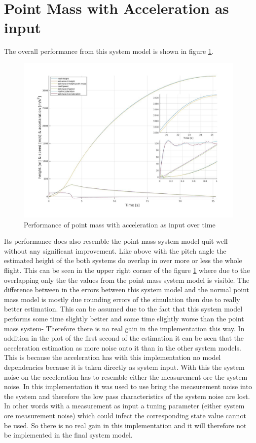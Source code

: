 \newpage
\section{Point Mass with Acceleration as input}
The overall performance from this system model is shown in figure \ref{fig:PointMassAccInputPerformance}.

\begin{figure}[h!]
 \centering
 \includegraphics[width=.8 \textwidth]{./Pictures/PointMassAccInputPerformance.jpg}
 \caption{Performance of point mass with acceleration as input over time}
 \label{fig:PointMassAccInputPerformance}
\end{figure}

Its performance does also resemble the point mass system model quit well without any significant improvement.
Like above with the pitch angle the estimated height of the both systems do overlap in over more or less the whole flight.
This can be seen in the upper right corner of the figure \ref{fig:PointMassAccInputPerformance} where due to the overlapping only the the values from the point mass system model is visible.
The difference between in the errors between this system model and the normal point mass model is mostly due rounding errors of the simulation then due to really better estimation.
This can be assumed due to the fact that this system model performs some time slightly better and some time slightly worse than the point mass system-
Therefore there is no real gain in the implementation this way.
In addition in the plot of the first second of the estimation it can be seen that the acceleration estimation as more noise onto it than in the other system models.
This is because the acceleration has with this implementation no model dependencies because it is taken directly as system input.
With this the system noise on the acceleration has to resemble either the measurement ore the system noise.
In this implementation it was used to use bring the measurement noise into the system and therefore the low pass characteristics of the system noise are lost.
In other words with a measurement as input a tuning parameter (either system ore measurement noise) which could infect the corresponding state value cannot be used.
So there is no real gain in this implementation and it will therefore not be implemented in the final system model.

